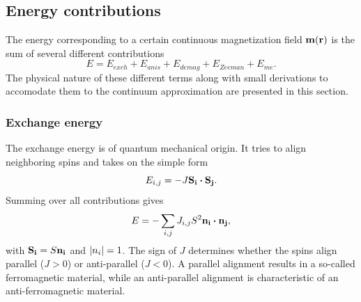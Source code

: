 \documentclass[10pt,a4paper]{article}
\begin{document}
\subsection{Energy contributions}
The energy corresponding to a certain continuous magnetization field $\vb{m}(\vb{r})$ is the sum of several different contributions
\begin{equation}
    E = E_{exch} + E_{anis} + E_{demag} + E_{Zeeman} + E_{me} \mathrm{.} \label{eq:Energy_Terms}
\end{equation}
The physical nature of these different terms along with small derivations to accomodate them to the continuum approximation are presented in this section.
\subsubsection{Exchange energy}
\label{par:Energy_Exchange}
The exchange energy is of quantum mechanical origin. It tries to align neighboring spins and takes on the simple form
\begin{equation}
    E_{i,j} = -J \vb{S_i} \vdot \vb{S_j} \mathrm{.}
    \label{eq:Energy_ExchangeEnergy_Discrete}
\end{equation}
Summing over all contributions gives
\begin{equation}
    E = -\sum_{i,j} J_{i,j} S^2 \vb{n_i} \vdot \vb{n_j} \mathrm{,}
    \label{eq:Energy_ExchangeEnergy_SumDiscrete}
\end{equation}
with $\vb{S_i} = S \vb{n_i}$ and $\abs{n_i} = 1$. 
The sign of $J$ determines whether the spins align parallel ($J>0$) or anti-parallel ($J<0$). A parallel alignment results in a so-called ferromagnetic material, while an anti-parallel alignment is characteristic of an anti-ferromagnetic material.
\end{document}
